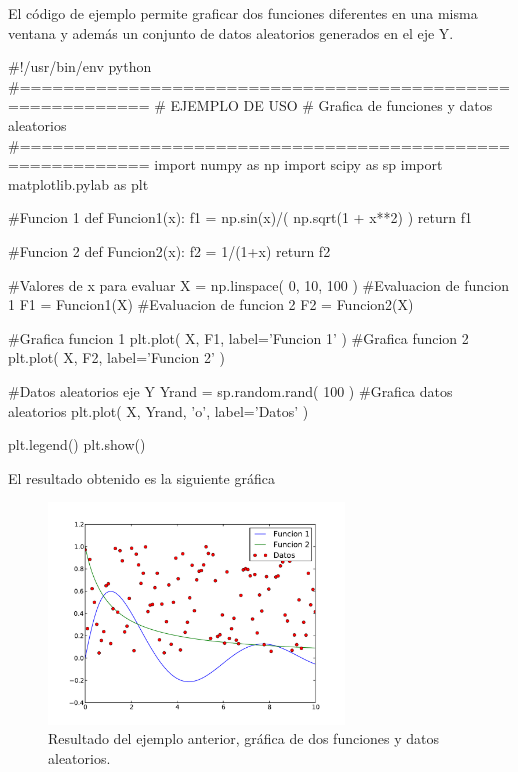 El código de ejemplo permite graficar dos funciones diferentes en una misma
ventana y además un conjunto de datos aleatorios generados en el eje Y.


\begin{listing}[style=python]
#!/usr/bin/env python
#==========================================================
# EJEMPLO DE USO
# Grafica de funciones y datos aleatorios
#==========================================================
import numpy as np
import scipy as sp
import matplotlib.pylab as plt

#Funcion 1
def Funcion1(x):
    f1 = np.sin(x)/( np.sqrt(1 + x**2) )
    return f1
    
#Funcion 2
def Funcion2(x):
    f2 = 1/(1+x)
    return f2
    
#Valores de x para evaluar
X = np.linspace( 0, 10, 100 )
#Evaluacion de funcion 1
F1 = Funcion1(X)
#Evaluacion de funcion 2
F2 = Funcion2(X)

#Grafica funcion 1
plt.plot( X, F1, label='Funcion 1' )
#Grafica funcion 2
plt.plot( X, F2, label='Funcion 2' )

#Datos aleatorios eje Y
Yrand = sp.random.rand( 100 )
#Grafica datos aleatorios
plt.plot( X, Yrand, 'o', label='Datos' )

plt.legend()
plt.show()
\end{listing}


El resultado obtenido es la siguiente gráfica

\begin{figure}[htbp]
	\centering
	\includegraphics[width=0.7\textwidth]
	{./pictures/usage_01.pdf}

	\caption{\small{Resultado del ejemplo anterior, gráfica de dos funciones
	y datos aleatorios.}}
	
	\label{fig:small_pedulum}
\end{figure}


